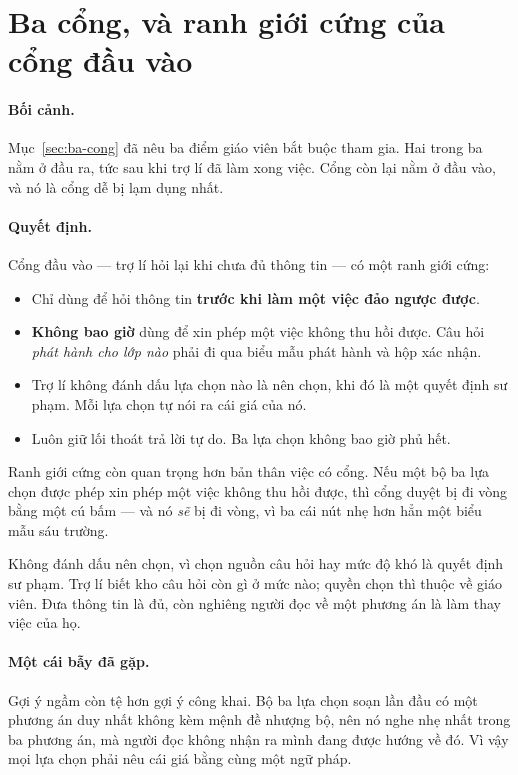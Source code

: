 \section{Ba cổng, và ranh giới cứng của cổng đầu vào}

\paragraph{Bối cảnh.} Mục~\ref{sec:ba-cong} đã nêu ba điểm giáo viên bắt buộc tham gia. Hai
trong ba nằm ở đầu ra, tức sau khi trợ lí đã làm xong việc. Cổng còn lại nằm ở đầu vào, và nó là
cổng dễ bị lạm dụng nhất.

\paragraph{Quyết định.} Cổng đầu vào --- trợ lí hỏi lại khi chưa đủ thông tin --- có một ranh giới
cứng:

\begin{itemize}
  \item Chỉ dùng để hỏi thông tin \textbf{trước khi làm một việc đảo ngược được}.
  \item \textbf{Không bao giờ} dùng để xin phép một việc không thu hồi được. Câu hỏi
        \emph{phát hành cho lớp nào} phải đi qua biểu mẫu phát hành và hộp xác nhận.
  \item Trợ lí không đánh dấu lựa chọn nào là nên chọn, khi đó là một quyết định sư phạm. Mỗi
        lựa chọn tự nói ra cái giá của nó.
  \item Luôn giữ lối thoát trả lời tự do. Ba lựa chọn không bao giờ phủ hết.
\end{itemize}

Ranh giới cứng còn quan trọng hơn bản thân việc có cổng. Nếu một bộ ba lựa chọn được phép xin
phép một việc không thu hồi được, thì cổng duyệt bị đi vòng bằng một cú bấm --- và nó \emph{sẽ}
bị đi vòng, vì ba cái nút nhẹ hơn hẳn một biểu mẫu sáu trường.

Không đánh dấu nên chọn, vì chọn nguồn câu hỏi hay mức độ khó là quyết định sư phạm. Trợ lí biết
kho câu hỏi còn gì ở mức nào; quyền chọn thì thuộc về giáo viên. Đưa thông tin là đủ, còn nghiêng
người đọc về một phương án là làm thay việc của họ.

\paragraph{Một cái bẫy đã gặp.} Gợi ý ngầm còn tệ hơn gợi ý công khai. Bộ ba lựa chọn soạn lần
đầu có một phương án duy nhất không kèm mệnh đề nhượng bộ, nên nó nghe nhẹ nhất trong ba phương
án, mà người đọc không nhận ra mình đang được hướng về đó. Vì vậy mọi lựa chọn phải nêu cái giá
bằng cùng một ngữ pháp.

